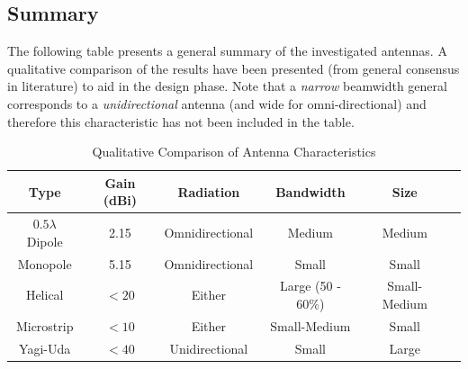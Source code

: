 \subsection{Summary}
The following table presents a general summary of the investigated antennas. A qualitative comparison of the results have been presented (from general consensus in literature) to aid in the design phase. Note that a \textit{narrow} beamwidth general corresponds to a \textit{unidirectional} antenna (and wide for omni-directional) and therefore this characteristic has not been included in the table.

\begin{table}[!htb]
  \centering
  \hspace*{-2cm}
  \renewcommand{\arraystretch}{1.2}
  \begin{tabular}{ |c|c|c|c|c|c| }
  \hline
  \textbf{Type} & \textbf{Gain (dBi)} & \textbf{Radiation} & \textbf{Bandwidth} & \textbf{Size} \\ \hline
  $0.5 \lambda$ Dipole & 2.15 & Omnidirectional & Medium & Medium \\ \hline
  Monopole & 5.15 & Omnidirectional & Small & Small \\ \hline
  Helical & $<20$ & Either & Large (50 - 60\%) & Small-Medium \\ \hline
  Microstrip & $<10$ & Either & Small-Medium & Small \\ \hline
  Yagi-Uda & $<40$ & Unidirectional & Small & Large \\ \hline
  \end{tabular}
  \caption{Qualitative Comparison of Antenna Characteristics \cite{site-antennaTheory}}
  \label{tab:antenna_characteristics}
\end{table}